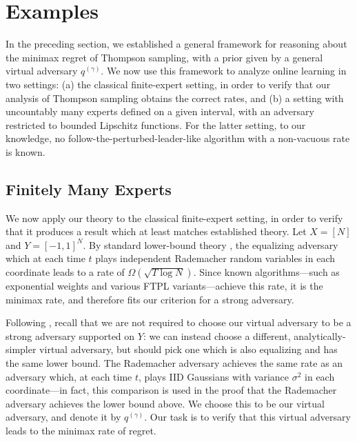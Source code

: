 \documentclass[preprint,12pt]{colt2025}
\begin{document}
\section{Examples}

In the preceding section, we established a general framework for reasoning about the minimax regret of Thompson sampling, with a prior given by a general virtual adversary $q^{(\gamma)}$.
We now use this framework to analyze online learning in two settings: (a) the classical finite-expert setting, in order to verify that our analysis of Thompson sampling obtains the correct rates, and (b) a setting with uncountably many experts defined on a given interval, with an adversary restricted to bounded Lipschitz functions. 
For the latter setting, to our knowledge, no follow-the-perturbed-leader-like algorithm with a non-vacuous rate is known.

\subsection{Finitely Many Experts}
\label{sec:finite-dimensions}

We now apply our theory to the classical finite-expert setting, in order to verify that it produces a result which at least matches established theory.
Let $X = [N]$ and $Y = [-1,1]^N$.
By standard lower-bound theory \cite{cesabianchi2006prediction}, the equalizing adversary which at each time $t$ plays independent Rademacher random variables in each coordinate leads to a rate of $\Omega(\sqrt{T\log N})$. Since known algorithms---such as exponential weights and various FTPL variants---achieve this rate, it is the minimax rate, and therefore fits our criterion for a strong adversary.

Following , recall that we are not required to choose our virtual adversary to be a strong adversary supported on $Y$: we can instead choose a different, analytically-simpler virtual adversary, but should pick one which is also equalizing and has the same lower bound.
The Rademacher adversary achieves the same rate as an adversary which, at each time $t$, plays IID Gaussians with variance $\sigma^2$ in each coordinate---in fact, this comparison is used in the proof that the Rademacher adversary achieves the lower bound above.
We choose this to be our virtual adversary, and denote it by $q^{(\gamma)}$.
Our task is to verify that this virtual adversary leads to the minimax rate of regret.
\end{document}

